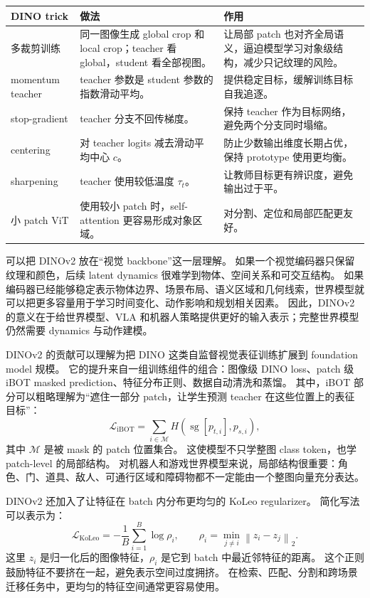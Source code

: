 \documentclass[11pt,a4paper]{ctexart}
\begin{document}
\begin{longtable}{p{} p{} p{}}
\toprule
DINO trick & 做法 & 作用 \\
\midrule
多裁剪训练 & 同一图像生成 global crop 和 local crop；teacher 看 global，student 看全部视图。 & 让局部 patch 也对齐全局语义，逼迫模型学习对象级结构，减少只记纹理的风险。 \\
momentum teacher & teacher 参数是 student 参数的指数滑动平均。 & 提供稳定目标，缓解训练目标自我追逐。 \\
stop-gradient & teacher 分支不回传梯度。 & 保持 teacher 作为目标网络，避免两个分支同时塌缩。 \\
centering & 对 teacher logits 减去滑动平均中心 $c$。 & 防止少数输出维度长期占优，保持 prototype 使用更均衡。 \\
sharpening & teacher 使用较低温度 $\tau_t$。 & 让教师目标更有辨识度，避免输出过于平。 \\
小 patch ViT & 使用较小 patch 时，self-attention 更容易形成对象区域。 & 对分割、定位和局部匹配更友好。 \\
\bottomrule
\end{longtable}

可以把 DINOv2 放在“视觉 backbone”这一层理解。
如果一个视觉编码器只保留纹理和颜色，后续 latent dynamics 很难学到物体、空间关系和可交互结构。
如果编码器已经能够稳定表示物体边界、场景布局、语义区域和几何线索，世界模型就可以把更多容量用于学习时间变化、动作影响和规划相关因素。
因此，DINOv2 的意义在于给世界模型、VLA 和机器人策略提供更好的输入表示；完整世界模型仍然需要 dynamics 与动作建模。

DINOv2 的贡献可以理解为把 DINO 这类自监督视觉表征训练扩展到 foundation model 规模。
它的提升来自一组训练组件的组合：图像级 DINO loss、patch 级 iBOT masked prediction、特征分布正则、数据自动清洗和蒸馏。
其中，iBOT 部分可以粗略理解为“遮住一部分 patch，让学生预测 teacher 在这些位置上的表征目标”：
\begin{equation}
  \mathcal{L}_{\text{iBOT}}
  =
  \sum_{i\in\mathcal{M}}
  H\left(\operatorname{sg}\left[p_{t,i}\right], p_{s,i}\right),
\end{equation}
其中 $\mathcal{M}$ 是被 mask 的 patch 位置集合。
这使模型不只学整图 class token，也学 patch-level 的局部结构。
对机器人和游戏世界模型来说，局部结构很重要：角色、门、道具、敌人、可通行区域和障碍物都不一定能由一个整图向量充分表达。

DINOv2 还加入了让特征在 batch 内分布更均匀的 KoLeo regularizer。
简化写法可以表示为：
\begin{equation}
  \mathcal{L}_{\text{KoLeo}}
  =
  -\frac{1}{B}\sum_{i=1}^{B}\log \rho_i,
  \qquad
  \rho_i=\min_{j\ne i}\left\|z_i-z_j\right\|_2 .
\end{equation}
这里 $z_i$ 是归一化后的图像特征，$\rho_i$ 是它到 batch 中最近邻特征的距离。
这个正则鼓励特征不要挤在一起，避免表示空间过度拥挤。
在检索、匹配、分割和跨场景迁移任务中，更均匀的特征空间通常更容易使用。
\end{document}
